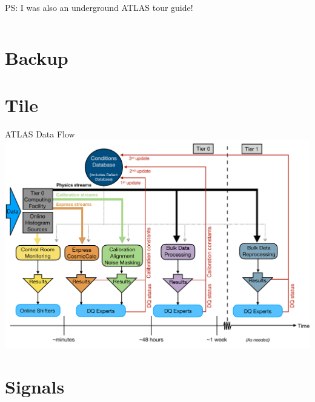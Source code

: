 \documentclass[aspectratio=169,xcolor=table]{beamer}
\begin{document}
\begin{frame}{PS: I was also an underground ATLAS tour guide!}
\begin{columns}
    \end{columns}
  \end{frame}
\appendix

\section{Backup }

  \section{Tile}

    \begin{frame}[t]{ATLAS Data Flow}
      \centering
      \includegraphics[height=.9\textheight,keepaspectratio=true]{ATLASDataFlowChart.png}
    \end{frame}

  \section{Signals }
\end{document}
